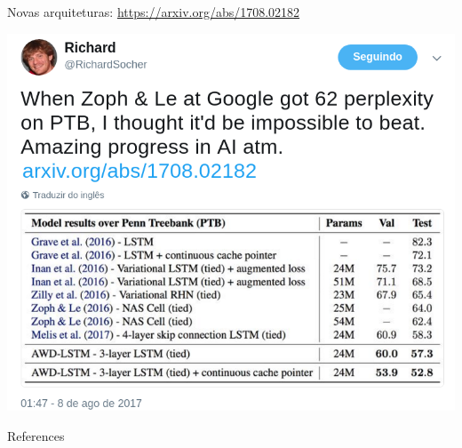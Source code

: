 \documentclass[10pt]{beamer}
\begin{document}
\begin{frame}{Novas arquiteturas: \url{https://arxiv.org/abs/1708.02182}}

\begin{center}
\includegraphics[scale=0.34]{images/SocherPTB.png}
\end{center}

\end{frame}

\begin{frame}[allowframebreaks]{References}

  
  

\end{frame}
\end{document}

